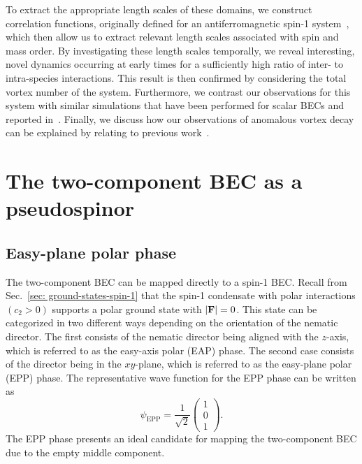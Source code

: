 To extract the appropriate length scales of these domains, we construct 
correlation functions, originally defined for an antiferromagnetic spin-1 
system~\cite{Symes2017}, which then allow us to extract relevant length scales
associated with spin and mass order.
By investigating these length scales temporally, we reveal interesting, 
novel dynamics occurring at early times for a sufficiently high ratio of 
inter- to intra-species interactions. 
This result is then confirmed by considering the total vortex number of the 
system. 
Furthermore, we contrast our observations for this system with similar
simulations that have been performed for scalar BECs and reported
in~\cite{Schole2012, Nowak2012, Karl2017}.
Finally, we discuss how our observations of anomalous vortex decay can be
explained by relating to previous work~\cite{Eto2011, Kasamatsu2016}.


\section{The two-component BEC as a pseudospinor}

\subsection{Easy-plane polar phase}\label{subsec:easy-plane-polar-phase}
The two-component BEC can be mapped directly to a spin-1 BEC\@.
Recall from Sec.~\ref{sec: ground-states-spin-1} that the spin-1 condensate
with polar interactions \((c_2 > 0)\) supports a polar ground state with
\(|\vb{F}|=0\).
This state can be categorized in two different ways depending on the orientation
of the nematic director.
The first consists of the nematic director being aligned with the \( z \)-axis,
which is referred to as the easy-axis polar (EAP) phase.
The second case consists of the director being in the \( xy \)-plane, which is
referred to as the easy-plane polar (EPP) phase.
The representative wave function for the EPP phase can be written as
\begin{equation}
    \psi_\mathrm{EPP} = \frac{1}{\sqrt{2}}\begin{pmatrix}
        1 \\ 0 \\ 1
    \end{pmatrix}.
    \label{eq:EPP_wavefunction}
\end{equation}
The EPP phase presents an ideal candidate for mapping the two-component BEC
due to the empty middle component.

